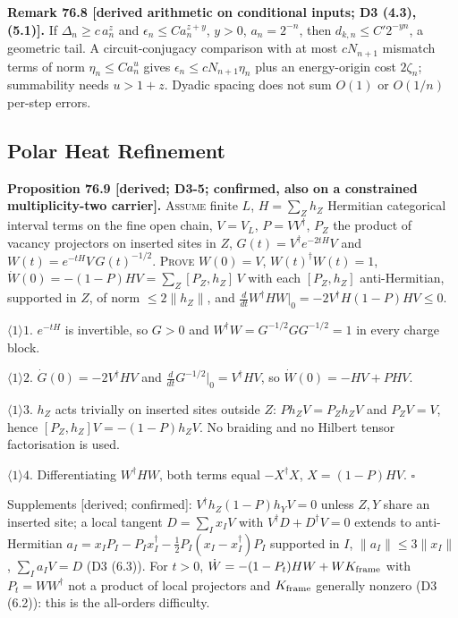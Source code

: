 \textbf{Remark 76.8 [derived arithmetic on conditional inputs; D3 (4.3), (5.1)].}  If \(\Delta_n\ge c\,a_n^z\) and
\(\epsilon_n\le Ca_n^{z+y}\), \(y>0\), \(a_n=2^{-n}\), then \(d_{k,n}\le C'2^{-yn}\), a geometric tail.  A circuit-conjugacy
comparison with at most \(cN_{n+1}\) mismatch terms of norm \(\eta_n\le Ca_n^u\) gives \(\epsilon_n\le cN_{n+1}\eta_n\)
plus an energy-origin cost \(2\zeta_n\); summability needs \(u>1+z\).  Dyadic spacing does not sum \(O(1)\) or
\(O(1/n)\) per-step errors.

\subsection{Polar Heat Refinement}

\textbf{Proposition 76.9 [derived; D3-5; confirmed, also on a constrained multiplicity-two carrier].}  \textsc{Assume}
finite \(L\), \(H=\sum_Zh_Z\) Hermitian categorical interval terms on the fine open chain, \(V=V_L\), \(P=VV^\dagger\),
\(P_Z\) the product of vacancy projectors on inserted sites in \(Z\), \(G(t)=V^\dagger e^{-2tH}V\) and
\(W(t)=e^{-tH}V\,G(t)^{-1/2}\).  \textsc{Prove} \(W(0)=V\), \(W(t)^\dagger W(t)=1\),
\(\dot W(0)=-(1-P)HV=\sum_Z[P_Z,h_Z]\,V\) with each \([P_Z,h_Z]\) anti-Hermitian, supported in \(Z\), of norm
\(\le2\|h_Z\|\), and \(\tfrac{d}{dt}W^\dagger HW|_{0}=-2V^\dagger H(1-P)HV\le0\).
\par\(\langle1\rangle1\). \(e^{-tH}\) is invertible, so \(G>0\) and \(W^\dagger W=G^{-1/2}GG^{-1/2}=1\) in every charge block.
\par\(\langle1\rangle2\). \(\dot G(0)=-2V^\dagger HV\) and \(\tfrac{d}{dt}G^{-1/2}|_0=V^\dagger HV\), so \(\dot W(0)=-HV+PHV\).
\par\(\langle1\rangle3\). \(h_Z\) acts trivially on inserted sites outside \(Z\): \(Ph_ZV=P_Zh_ZV\) and \(P_ZV=V\), hence
\([P_Z,h_Z]V=-(1-P)h_ZV\).  No braiding and no Hilbert tensor factorisation is used.
\par\(\langle1\rangle4\). Differentiating \(W^\dagger HW\), both terms equal \(-X^\dagger X\), \(X=(1-P)HV\).  \(\square\)
\par Supplements [derived; confirmed]: \(V^\dagger h_Z(1-P)h_YV=0\) unless \(Z,Y\) share an inserted site; a local tangent
\(D=\sum_Ix_IV\) with \(V^\dagger D+D^\dagger V=0\) extends to anti-Hermitian
\(a_I=x_IP_I-P_Ix_I^\dagger-\tfrac12P_I(x_I-x_I^\dagger)P_I\) supported in \(I\), \(\|a_I\|\le3\|x_I\|\),
\(\sum_Ia_IV=D\) (D3 (6.3)).  For \(t>0\), \(\dot W=-(1-P_t)HW+WK_{\rm frame}\) with \(P_t=WW^\dagger\) not a product of
local projectors and \(K_{\rm frame}\) generally nonzero (D3 (6.2)): this is the all-orders difficulty.


